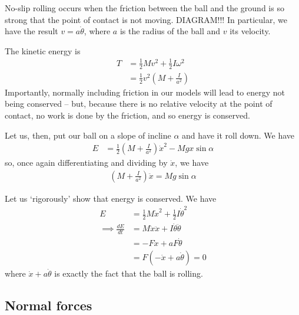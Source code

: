 \documentclass{../../template/note}
\begin{document}
    \begin{example*}
        No-slip rolling occurs when the friction between the ball and the ground is so strong that the point of contact is not moving. DIAGRAM!!! In particular, we have the result \(v = a\dot \theta\), where \(a\) is the radius of the ball and \(v\) its velocity.

        The kinetic energy is
        \begin{align*}
            T &= \frac 1 2 Mv^2 + \frac 1 2 I \omega^2 \\
            &= \frac 1 2 v^2 \left(M + \frac I {a^2}\right)
        \end{align*}
        Importantly, normally including friction in our models will lead to energy not being conserved -- but, because there is no relative velocity at the point of contact, no work is done by the friction, and so energy is conserved.

        Let us, then, put our ball on a slope of incline \(\alpha\) and have it roll down. We have
        \begin{align*}
            E &= \frac 1 2 \left(M + \frac I {a^2}\right) \dot x^2 - Mgx \sin \alpha
        \end{align*}
        so, once again differentiating and dividing by \(\dot x\), we have
        \begin{align*}
            \left(M + \frac I{a^2}\right) \ddot x = Mg \sin \alpha
        \end{align*}

        Let us `rigorously' show that energy is conserved. We have
        \begin{align*}
            E &= \frac 1 2 M \dot x^2 + \frac 1 2 I \dot \theta^2 \\
            \implies \frac{dE}{dt} &= M \dot x \ddot x + I \dot \theta \ddot \theta \\
            &= -F\dot x + a F \dot \theta \\
            &= F(-\dot x + a \dot \theta) = 0
        \end{align*}
        where \(\dot x + a \dot \theta\) is exactly the fact that the ball is rolling.        
    \end{example*}

    \subsection{Normal forces}
\end{document}

